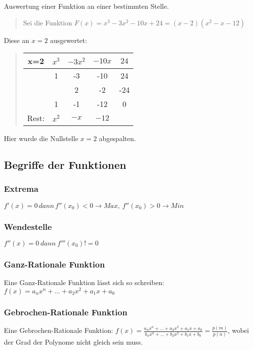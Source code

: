 Auswertung einer Funktion an einer bestimmten Stelle.
\begin{verse}
Sei die Funktion $F(x)=x^{3}-3x^{2}-10x+24=(x-2)(x^{2}-x-12)$
\end{verse}
Diese an $x=2$ ausgewertet:
\begin{verse}
\begin{tabular}{ccccc}
\hline 
\multicolumn{1}{|c}{x=2} & $x^{3}$ & $-3x^{2}$ & $-10x$ & \multicolumn{1}{c|}{$24$}\tabularnewline
\hline 
 & 1 & -3 & -10 & 24\tabularnewline
 &  & 2 & -2 & -24\tabularnewline
\hline 
 & 1 & -1 & -12 & 0\tabularnewline
\hline 
Rest: & $x^{2}$ & $-x$ & $-12$ & \tabularnewline
\end{tabular}
\end{verse}
Hier wurde die Nullstelle $x=2$ abgespalten.


\subsection*{Begriffe der Funktionen}


\subsubsection*{Extrema}

$f'(x)=0\, dann\, f''(x_{0})<0\rightarrow Max,\: f''(x_{0})>0\rightarrow Min$


\subsubsection*{Wendestelle}

$f''(x)=0\: dann\: f'''(x_{0})!=0$


\subsubsection*{Ganz-Rationale Funktion}

Eine Ganz-Rationale Funktion lässt sich so schreiben: $f(x)=a_{n}x^{n}+...+a_{2}x^{2}+a_{1}x+a_{0}$


\subsubsection*{Gebrochen-Rationale Funktion}

Eine Gebrochen-Rationale Funktion: $f(x)=\frac{a_{n}x^{n}+...+a_{2}x^{2}+a_{1}x+a_{0}}{b_{n}x^{n}+...+b_{2}x^{2}+b_{1}x+b_{0}}=\frac{p(m)}{p(n)}$,
wobei der Grad der Polynome nicht gleich sein muss.


